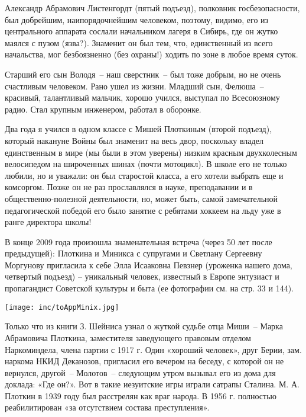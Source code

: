 \newline

Александр Абрамович Листенгордт (пятый подъезд), полковник госбезопасности, был добрейшим, наипорядочнейшим человеком, поэтому, видимо, его из центрального аппарата  сослали начальником лагеря  в Сибирь, где он жутко маялся с пузом (язва?). Знаменит он был тем, что, единственный из всего начальства, мог безбоязненно (без охраны!) ходить по зоне в любое время суток.


Старший его сын Володя~-- наш сверстник~-- был тоже добрым, но не очень счастливым человеком. Рано ушел из жизни. Младший сын, Фелюша~--  красивый, талантливый мальчик, хорошо учился, выступал по Всесоюзному радио. Стал крупным инженером, работал в оборонке.

\newline

Два года я учился в одном классе с Мишей Плоткиным (второй подъезд), который накануне Войны был знаменит на весь двор, поскольку владел единственным в мире (мы были в этом уверены) низким красным двухколесным велосипедом на широченных шинах (почти мотоцикл). В школе его не только любили, но и уважали: он был старостой класса, а его хотели выбрать еще и комсоргом. Позже он не раз прославлялся в науке, преподавании и в общественно-полезной деятельности, но, может быть, самой замечательной педагогической победой его было занятие с ребятами хоккеем на льду уже в ранге директора школы!

В конце 2009 года произошла знаменательная встреча (через 50 лет после предыдущей): Плоткина и Миникса с супругами и Светлану Сергеевну Моргунову пригласила к себе Элла Исааковна Певзнер (уроженка нашего дома, четвертый подъезд) – уникальный человек, известный в Европе энтузиаст и пропагандист Советской культуры и быта (ее фотографии см. на стр. 33 и 144).


\noindent\texttt{[image: inc/toAppMinix.jpg]}

Только что из книги З. Шейниса узнал о жуткой судьбе отца Миши~-- Марка Абрамовича Плоткина, заместителя заведующего правовым отделом Наркоминдела, члена партии с 1917 г. Один «хороший человек», друг Берии, зам. наркома НКИД Деканозов, пригласил его вечером на беседу, с которой он не вернулся, другой~-- Молотов~-- следующим утром вызывал его из дома для доклада: «Где он?». Вот в такие иезуитские игры играли сатрапы Сталина. М. А. Плоткин в 1939 году был расстрелян как враг народа. В 1956 г. полностью реабилитирован «за отсутствием состава преступления».  

